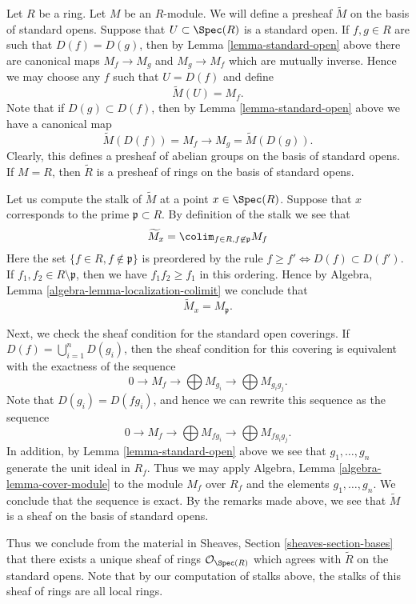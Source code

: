 \noindent
Let $R$ be a ring. Let $M$ be an $R$-module. We will define
a presheaf $\widetilde M$ on the basis of standard opens.
Suppose that $U \subset \Spec(R)$ is a standard open.
If $f, g \in R$ are such that $D(f) = D(g)$, then
by Lemma \ref{lemma-standard-open} above there are canonical
maps $M_f \to M_g$ and $M_g \to M_f$ which are mutually inverse.
Hence we may choose any $f$ such that $U = D(f)$
and define
$$
\widetilde M(U) = M_f.
$$
Note that if $D(g) \subset D(f)$, then by
Lemma \ref{lemma-standard-open} above we have
a canonical map
$$
\widetilde M(D(f)) = M_f \longrightarrow M_g = \widetilde M(D(g)).
$$
Clearly, this defines a presheaf of abelian groups on the basis
of standard opens. If $M = R$, then $\widetilde R$ is a presheaf
of rings on the basis of standard opens.

\medskip\noindent
Let us compute the stalk of $\widetilde M$ at a point $x \in \Spec(R)$.
Suppose that $x$ corresponds to the prime $\mathfrak p \subset R$.
By definition of the stalk we see that
$$
\widetilde M_x = \colim_{f\in R, f\not\in \mathfrak p} M_f
$$
Here the set $\{f \in R, f \not \in \mathfrak p\}$ is preordered by
the rule $f \geq f' \Leftrightarrow D(f) \subset D(f')$.
If $f_1, f_2 \in R \setminus \mathfrak p$, then we have
$f_1f_2 \geq f_1$ in this ordering. Hence by
Algebra, Lemma \ref{algebra-lemma-localization-colimit}
we conclude that
$$
\widetilde M_x = M_{\mathfrak p}.
$$

\medskip\noindent
Next, we check the sheaf condition for the standard open coverings.
If $D(f) = \bigcup_{i = 1}^n D(g_i)$, then the sheaf condition
for this covering is equivalent with the exactness of the
sequence
$$
0 \to M_f \to \bigoplus M_{g_i} \to \bigoplus M_{g_ig_j}.
$$
Note that $D(g_i) = D(fg_i)$, and hence we can rewrite this
sequence as the sequence
$$
0 \to M_f \to \bigoplus M_{fg_i} \to \bigoplus M_{fg_ig_j}.
$$
In addition, by Lemma \ref{lemma-standard-open} above
we see that $g_1, \ldots, g_n$ generate the unit ideal
in $R_f$. Thus we may apply
Algebra, Lemma \ref{algebra-lemma-cover-module}
to the module $M_f$ over $R_f$ and the elements $g_1, \ldots, g_n$.
We conclude that the sequence is exact. By the remarks
made above, we see that $\widetilde M$ is a sheaf
on the basis of standard opens.

\medskip\noindent
Thus we conclude from the material in
Sheaves, Section \ref{sheaves-section-bases}
that there exists a
unique sheaf of rings $\mathcal{O}_{\Spec(R)}$
which agrees with $\widetilde R$ on the standard opens.
Note that by our computation of stalks above, the
stalks of this sheaf of rings are all local rings.

